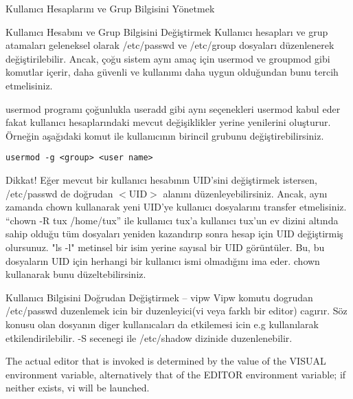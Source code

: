 \begin{section}{Kullanıcı Hesaplarını ve Grup Bilgisini Yönetmek}
\begin{subsection}{Kullanıcı Hesabını ve Grup Bilgisini Değiştirmek}
Kullanıcı hesapları ve grup atamaları geleneksel olarak /etc/passwd ve /etc/group dosyaları düzenlenerek değiştirilebilir. Ancak, çoğu sistem aynı amaç için usermod ve groupmod gibi komutlar içerir, daha güvenli ve kullanımı daha uygun olduğundan bunu tercih etmelisiniz.

usermod programı çoğunlukla useradd gibi aynı seçenekleri usermod kabul eder fakat kullanıcı hesaplarındaki mevcut değişiklikler yerine yenilerini oluşturur. Örneğin aşağıdaki komut ile kullanıcının birincil grubunu değiştirebilirsiniz.
\begin{verbatim}
usermod -g <group> <user name>
\end{verbatim}
Dikkat! Eğer mevcut bir kullanıcı hesabının UID'sini değiştirmek istersen, /etc/passwd de doğrudan $<$UID$>$ alanını düzenleyebilirsiniz. Ancak, aynı zamanda chown kullanarak yeni UID'ye kullanıcı dosyalarını transfer etmelisiniz. “chown -R tux /home/tux” ile kullanıcı tux'a kullanıcı tux'un ev dizini altında sahip olduğu tüm dosyaları yeniden kazandırıp sonra hesap için UID değiştirmiş olursunuz. "ls -l" metinsel bir isim yerine sayısal bir UID görüntüler. Bu, bu dosyaların UID için herhangi bir kullanıcı ismi olmadığını ima eder. chown kullanarak bunu düzeltebilirsiniz.
\end{subsection}
\begin{subsection}{Kullanıcı Bilgisini Doğrudan Değiştirmek -- vipw}
Vipw komutu dogrudan /etc/passwd duzenlemek icin bir duzenleyici(vi veya farklı bir editor) cagırır. Söz konusu olan dosyanın diger kullanıcaları da etkilemesi icin e.g kullanılarak etkilendirilebilir. -S secenegi ile /etc/shadow dizinide duzenlenebilir.

The actual editor that is invoked is determined by the value of the VISUAL environment variable, alternatively that of the EDITOR environment variable; if neither exists, vi will be launched.


\end{subsection}
\end{section}

